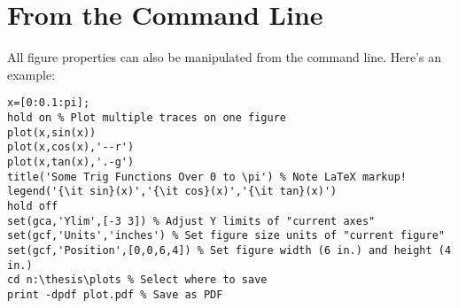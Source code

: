 \documentclass[letterpaper,12pt,titlepage,oneside,final]{book}
\let\origdoublepage\cleardoublepage
\newcommand{\clearemptydoublepage}{%
\clearpage{\pagestyle{empty}\origdoublepage}}
\let\cleardoublepage\clearemptydoublepage
\begin{document}
\section{From the Command Line} 
All figure properties can also be manipulated from the command line. Here's an example: 
\begin{verbatim}
x=[0:0.1:pi];
hold on % Plot multiple traces on one figure
plot(x,sin(x))
plot(x,cos(x),'--r')
plot(x,tan(x),'.-g')
title('Some Trig Functions Over 0 to \pi') % Note LaTeX markup!
legend('{\it sin}(x)','{\it cos}(x)','{\it tan}(x)')
hold off
set(gca,'Ylim',[-3 3]) % Adjust Y limits of "current axes"
set(gcf,'Units','inches') % Set figure size units of "current figure"
set(gcf,'Position',[0,0,6,4]) % Set figure width (6 in.) and height (4 in.)
cd n:\thesis\plots % Select where to save
print -dpdf plot.pdf % Save as PDF
\end{verbatim}




\cleardoublepage %
\renewcommand*{\bibname}{References}




\nocite{*}
\end{document}
